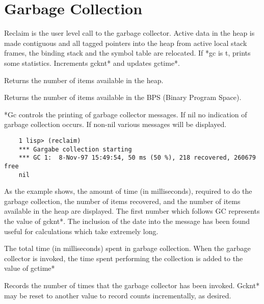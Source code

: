 \section{Garbage Collection}


{    Reclaim is the user level call  to  the  garbage  collector.
    Active  data  in  the heap is made contiguous and all tagged
    pointers into the heap from active local stack  frames,  the
    binding stack and the symbol table are relocated.  If *gc is
    t,  prints  some  statistics.  Increments gcknt* and updates
    gctime*.
}

{    Returns the number of items available in the heap.  }

{    Returns the number of items available  in  the  BPS  (Binary
    Program Space).  }

{
    *Gc  controls  the printing  of garbage  collector messages.
    If nil no indication  of  garbage  collection  occurs.    If
    non-nil various messages will be displayed.
}

\begin{verbatim}
    1 lisp> (reclaim)
    *** Gargabe collection starting
    *** GC 1:  8-Nov-97 15:49:54, 50 ms (50 %), 218 recovered, 260679 free
    nil
\end{verbatim}
    As  the example shows, the amount of time (in milliseconds),
    required to do the garbage collection, the number  of  items
    recovered, and the number of items available in the heap are
    displayed.  The first number which follows GC represents the
    value of gcknt*. The inclusion of the date into the message
    has been found useful
    for calculations which take extremely long.

{
    The   total   time   (in   milliseconds)  spent  in  garbage
    collection.  When the garbage collector is invoked, the time
    spent performing the collection is added  to  the  value  of
    gctime* }

{
    Records  the  number of times that the garbage collector has
    been invoked.  Gcknt* may  be  reset  to  another  value  to
 			record counts incrementally, as desired.}
